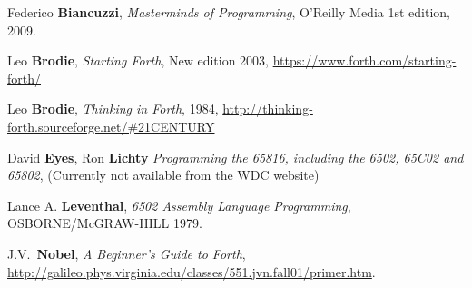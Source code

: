 \begin{thebibliography}{99}

        Federico \textbf{Biancuzzi},
  	\textit{Masterminds of Programming},
	O'Reilly Media
  	1st edition,
	2009.

        Leo \textbf{Brodie},
  	\textit{Starting Forth},
  	New edition 2003,
        \href{https://www.forth.com/starting-forth/}{https://www.forth.com/starting-forth/}

        Leo \textbf{Brodie},
  	\textit{Thinking in Forth},
  	1984,
        \href{http://thinking-forth.sourceforge.net/\#21CENTURY}{http://thinking-forth.sourceforge.net/\#21CENTURY}

        David \textbf{Eyes}, Ron \textbf{Lichty}
  	\textit{Programming the 65816, including the 6502, 65C02 and 65802},
        (Currently not available from the WDC website) 

        Lance A. \textbf{Leventhal},
  	\textit{6502 Assembly Language Programming},
	OSBORNE/McGRAW-HILL
	1979.

        J.V.~\textbf{Nobel},
  	\textit{A Beginner's Guide to Forth},
        \href{http://galileo.phys.virginia.edu/classes/551.jvn.fall01/primer.htm}{http://galileo.phys.virginia.edu/classes/551.jvn.fall01/primer.htm}.

\end{thebibliography}

